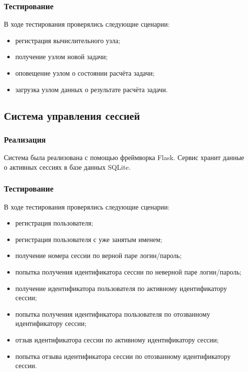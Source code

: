 \documentclass[a4paper,12pt]{report}
\numberwithin{equation}{section}
\begin{document}
  \subsubsection{Тестирование}
  В ходе тестирования проверялись следующие сценарии:
  
  \begin{itemize}
    \item регистрация вычислительного узла;
    \item получение узлом новой задачи;
    \item оповещение узлом о состоянии расчёта задачи;
    \item загрузка узлом данных о результате расчёта задачи.
  \end{itemize}
  \subsection{Система управления сессией}
  \subsubsection{Реализация}
  Система была реализована с помощью фреймворка Flask.
  Сервис хранит данные о активных сессиях в базе данных SQLite.
  
  \subsubsection{Тестирование}
  В ходе тестирования проверялись следующие сценарии:
  
  \begin{itemize}
    \item регистрация пользователя;
    \item регистрация пользователя с уже занятым именем;
    \item получение номера сессии по верной паре логин/пароль;
    \item попытка получения идентификатора сессии по неверной паре логин/пароль;
    \item получение идентификатора пользователя по активному идентификатору сессии;
    \item попытка получения идентификатора пользователя по отозванному идентификатору сессии;
    \item отзыв идентификатора сессии по активному идентификатору сессии;        \item попытка отзыва идентификатора сессии по отозванному идентификатору сессии.
  \end{itemize}
  
\end{document}
